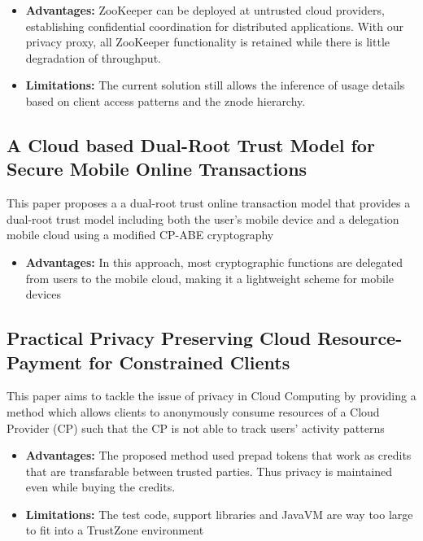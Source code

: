 \documentclass[conference]{IEEEtran}
\begin{document}
\begin{itemize}
    \item \textbf{Advantages:} ZooKeeper can be deployed at untrusted cloud providers, establishing confidential coordination for distributed applications. With our privacy proxy, all ZooKeeper functionality is retained while there is little degradation of throughput.
    \item \textbf{Limitations:} The current solution still allows the inference of usage details based on client access patterns and the znode hierarchy.
\end{itemize}


\subsection{A Cloud based Dual-Root Trust Model for Secure Mobile Online Transactions }
\cite{cloud5} This paper proposes a a dual-root trust online transaction model that provides a dual-root trust model including both the user’s mobile device and a delegation mobile cloud using  a modified CP-ABE cryptography

\begin{itemize}
    \item \textbf{Advantages:} In this approach, most cryptographic functions are delegated from users to the mobile cloud, making it a lightweight scheme for mobile devices
\end{itemize}


\subsection{Practical Privacy Preserving Cloud Resource-Payment for Constrained Clients}
\cite{cloud6} This paper aims to tackle the issue of privacy in Cloud Computing by providing a method which allows clients to anonymously consume resources of a Cloud Provider (CP) such that the CP is not able to track users’ activity patterns

\begin{itemize}
    \item \textbf{Advantages:} The proposed method used prepad tokens that work as credits that are transfarable between trusted parties. Thus privacy is maintained even while buying the credits.
    \item \textbf{Limitations:} The test code, support libraries and JavaVM are way too large to fit into a TrustZone environment
\end{itemize}
\end{document}
